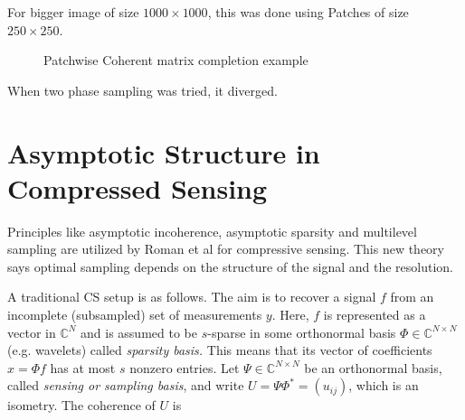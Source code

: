\documentclass{article}
\begin{document}
For bigger image of size $1000 \times 1000$, this was done using Patches of size $250 \times 250$.  

\begin{figure}[ht]
 \centering    
 \hfill
 \caption{Patchwise Coherent matrix completion example}
\end{figure}

When two phase sampling was tried, it diverged. 


\section{Asymptotic Structure in Compressed Sensing}
Principles like asymptotic incoherence, asymptotic sparsity and multilevel sampling are utilized by Roman et al for compressive sensing.\cite{Roman2014OnSensing}  This new theory says optimal sampling depends on the structure of the signal and the resolution.


A traditional CS setup is as follows. The aim is to recover a signal $f$ from an incomplete (subsampled) set of measurements $y$. Here,
$f$ is represented as a vector in $\mathbb{C}^N$ and is assumed to be $s$-sparse in
some orthonormal basis $\Phi \in \mathbb{C}^{N \times N}$ (e.g. wavelets) called \textit{sparsity
basis.} This means that its vector of coefficients $x = \Phi f$ has at most $s$ nonzero entries. Let $\Psi \in \mathbb{C}^{N \times N}$ be an orthonormal basis, called
\textit{sensing or sampling basis}, and write $U = \Psi \Phi^* = (u_{ij})$, which is an 
isometry. The coherence of $U$ is
\end{document}
